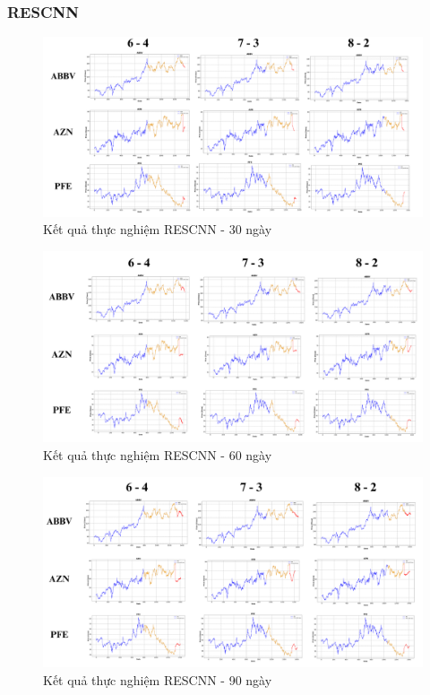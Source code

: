 \documentclass[conference]{IEEEtran}
\begin{document}
\subsubsection{RESCNN}
\begin{figure}[H]
    \centering
    \begin{minipage}{0.5\textwidth}
    \centering
    \includegraphics[width=1\textwidth]{Image/RESCNN30.png}
    \caption{Kết quả thực nghiệm RESCNN - 30 ngày}
    \label{fig:1}
    \end{minipage}
\end{figure}
\begin{figure}[H]
    \centering
    \begin{minipage}{0.5\textwidth}
    \centering
    \includegraphics[width=1\textwidth]{Image/RESCNN60.png}
    \caption{Kết quả thực nghiệm RESCNN - 60 ngày}
    \label{fig:1}
    \end{minipage}
\end{figure}
\begin{figure}[H]
    \centering
    \begin{minipage}{0.5\textwidth}
    \centering
    \includegraphics[width=1\textwidth]{Image/RESCNN90.png}
    \caption{Kết quả thực nghiệm RESCNN - 90 ngày}
    \label{fig:1}
    \end{minipage}
\end{figure}
\end{document}
